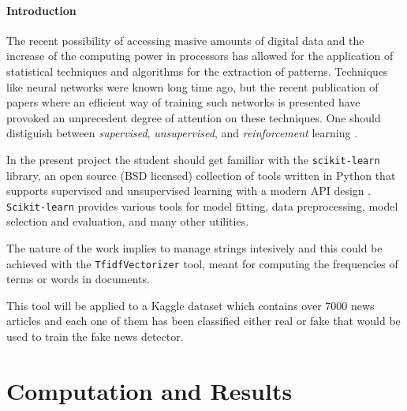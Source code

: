 \documentclass[11pt,a4paper,BCOR12mm, headexclude, footexclude, twoside, openright]{scrartcl}
\begin{document}
\paragraph{Introduction}

The recent possibility of accessing masive amounts of digital data and the increase of the computing power in processors has allowed for the application of statistical techniques and algorithms for the extraction of patterns. Techniques like neural networks were known long time ago, but the recent publication of papers where an efficient way of training such networks is presented \cite{Hinton2006} have provoked an unprecedent degree of attention on these techniques. One should distiguish between \emph{supervised}, \emph{unsupervised}, and \emph{reinforcement} learning \cite{Hao2018}.  


In the present project the student should get familiar with the \texttt{scikit-learn} library, an open source (BSD licensed)  collection of tools written in Python that supports supervised and unsupervised learning \cite{scikit-learn} with a modern API design \cite{scikit-api}. \texttt{Scikit-learn} provides various tools for model fitting, data preprocessing, model selection and evaluation, and many other utilities.

The nature of the work implies to manage strings intesively and this could be achieved with the \texttt{TfidfVectorizer} tool, meant for computing the frequencies of terms or words in  documents.

This tool will be applied to a Kaggle dataset which contains over 7000 news articles and each one of them has been classified either real or fake \cite{faken_kaggle} that would be used to train the fake news detector.

{%
  \renewcommand{\headrulewidth}{0.5pt}%
  \renewcommand{\footrulewidth}{0.5pt}
  \fancyhf{}%
  \fancyhead[R]{\emph{\footnotesize \today}}
}

\thispagestyle{plain}



\section*{Computation and Results}
\end{document}
